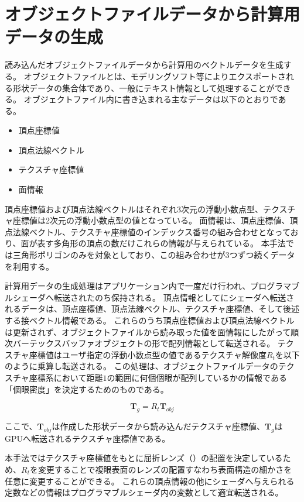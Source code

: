 \section{オブジェクトファイルデータから計算用データの生成}
\label{SCalcData}

読み込んだオブジェクトファイルデータから計算用のベクトルデータを生成する。
オブジェクトファイルとは、モデリングソフト等によりエクスポートされる形状データの集合体であり、一般にテキスト情報として処理することができる。
オブジェクトファイル内に書き込まれる主なデータは以下のとおりである。
\begin{itemize}
\item 頂点座標値
\item 頂点法線ベクトル
\item テクスチャ座標値
\item 面情報
\end{itemize}
頂点座標値および頂点法線ベクトルはそれぞれ3次元の浮動小数点型、テクスチャ座標値は2次元の浮動小数点型の値となっている。
面情報は、頂点座標値、頂点法線ベクトル、テクスチャ座標値のインデックス番号の組み合わせとなっており、面が表す多角形の頂点の数だけこれらの情報が与えられている。
本手法では三角形ポリゴンのみを対象としており、この組み合わせが3つずつ続くデータを利用する。

計算用データの生成処理はアプリケーション内で一度だけ行われ、プログラマブルシェーダへ転送されたのち保持される。
頂点情報としてにシェーダへ転送されるデータは、頂点座標値、頂点法線ベクトル、テクスチャ座標値、そして後述する接ベクトル情報である。
これらのうち頂点座標値および頂点法線ベクトルは更新されず、オブジェクトファイルから読み取った値を面情報にしたがって順次バーテックスバッファオブジェクトの形で配列情報として転送される。
テクスチャ座標値はユーザ指定の浮動小数点型の値であるテクスチャ解像度$R_t$を以下のように乗算し転送される。
この処理は、オブジェクトファイルデータのテクスチャ座標系において距離$1$の範囲に何個個眼が配列しているかの情報である「個眼密度」を決定するためのものである。

\begin{equation}
{\bm T_g} = R_t{\bm T_{obj}}
\end{equation}

\noindent
ここで、$\bm{T}_{obj}$は作成した形状データから読み込んだテクスチャ座標値、$\bm{T}_g$はGPUへ転送されるテクスチャ座標値である。

本手法ではテクスチャ座標値をもとに屈折レンズ（）の配置を決定しているため、$R_t$を変更することで複眼表面のレンズの配置すなわち表面構造の細かさを任意に変更することができる。
これらの頂点情報の他にシェーダへ与えられる定数などの情報はプログラマブルシェーダ内の変数として適宜転送される。

